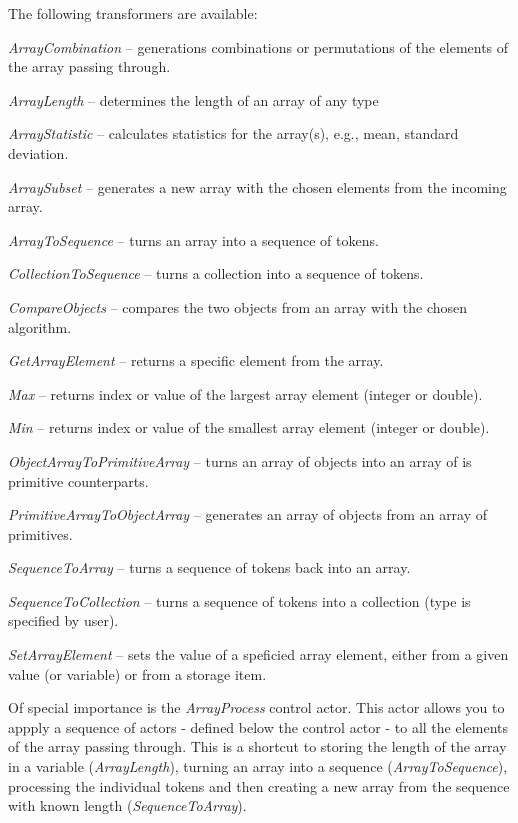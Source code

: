 \noindent The following transformers are available:
\begin{tight_itemize}
	\item \textit{ArrayCombination} -- generations combinations or permutations of
	the elements of the array passing through.
	\item \textit{ArrayLength} -- determines the length of an array of any type
	\item \textit{ArrayStatistic} -- calculates statistics for the array(s), e.g.,
	mean, standard deviation.
	\item \textit{ArraySubset} -- generates a new array with the chosen elements
	from the incoming array.
	\item \textit{ArrayToSequence} -- turns an array into a sequence of tokens.
	\item \textit{CollectionToSequence} -- turns a collection into a sequence of
	tokens.
	\item \textit{CompareObjects} -- compares the two objects from an array
	with the chosen algorithm.
	\item \textit{GetArrayElement} -- returns a specific element from the array.
	\item \textit{Max} -- returns index or value of the largest array element
	(integer or double).
	\item \textit{Min} -- returns index or value of the smallest array element
	(integer or double).
	\item \textit{ObjectArrayToPrimitiveArray} -- turns an array of objects
	into an array of is primitive counterparts.
	\item \textit{PrimitiveArrayToObjectArray} -- generates an array of objects
	from an array of primitives.
	\item \textit{SequenceToArray} -- turns a sequence of tokens back into an
	array.
	\item \textit{SequenceToCollection} -- turns a sequence of tokens into a
	collection (type is specified by user).
	\item \textit{SetArrayElement} -- sets the value of a speficied array 
	element, either from a given value (or variable) or from a storage item.
\end{tight_itemize}
Of special importance is the \textit{ArrayProcess} control actor. This actor
allows you to appply a sequence of actors - defined below the control actor - to
all the elements of the array passing through. This is a shortcut to storing the
length of the array in a variable (\textit{ArrayLength}), turning an array into
a sequence (\textit{ArrayToSequence}), processing the individual tokens and then
creating a new array from the sequence with known length
(\textit{SequenceToArray}).

